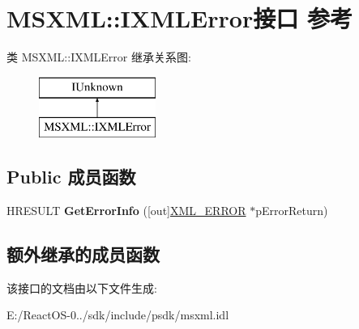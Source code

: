 \hypertarget{interface_m_s_x_m_l_1_1_i_x_m_l_error}{}\section{M\+S\+X\+ML\+:\+:I\+X\+M\+L\+Error接口 参考}
\label{interface_m_s_x_m_l_1_1_i_x_m_l_error}
类 M\+S\+X\+ML\+:\+:I\+X\+M\+L\+Error 继承关系图\+:\begin{figure}[H]
\begin{center}
\leavevmode
\includegraphics[height=2.000000cm]{interface_m_s_x_m_l_1_1_i_x_m_l_error}
\end{center}
\end{figure}
\subsection*{Public 成员函数}
\begin{DoxyCompactItemize}
\item 
\mbox{\label{interface_m_s_x_m_l_1_1_i_x_m_l_error_a8f9b7cb4a41a58ad2610ae843dfbbe55}} 
H\+R\+E\+S\+U\+LT {\bfseries Get\+Error\+Info} (\mbox{[}out\mbox{]}\hyperlink{struct_m_s_x_m_l_1_1__xml__error}{X\+M\+L\+\_\+\+E\+R\+R\+OR} $\ast$p\+Error\+Return)
\end{DoxyCompactItemize}
\subsection*{额外继承的成员函数}


该接口的文档由以下文件生成\+:\begin{DoxyCompactItemize}
\item 
E\+:/\+React\+O\+S-\/0../sdk/include/psdk/msxml.\+idl\end{DoxyCompactItemize}
